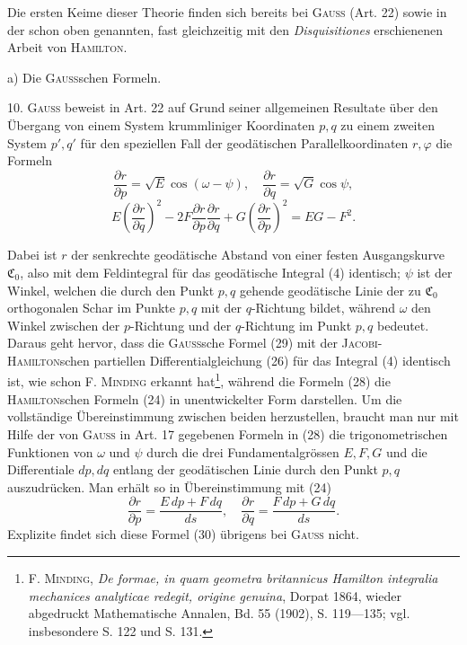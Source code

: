 Die ersten Keime dieser Theorie finden sich bereits bei \textsc{Gauss} (Art. 22)
sowie in der schon oben genannten, fast gleichzeitig mit den \textit{Disquisitiones}
erschienenen Arbeit von \textsc{Hamilton}.
\par\noindent\hspace*{\parindent}a) Die \textsc{Gauss}schen Formeln.
\par\noindent\hspace*{\parindent}10. \textsc{Gauss} beweist in Art. 22 auf Grund seiner allgemeinen Resultate
über den Übergang von einem System krummliniger Koordinaten $p,q$ zu einem
zweiten System $p',q'$ für den speziellen Fall der geodätischen Parallelkoordinaten
$r,\varphi$ die Formeln
\begin{equation*}\tag{28}
\frac{\partial r}{\partial p}=\sqrt E\cos(\omega-\psi),\quad\frac{\partial r}{\partial q}=\sqrt G\cos\psi,
\end{equation*}
\begin{equation*}\tag{29}
E\left(\frac{\partial r}{\partial q}\right)^2-2F\frac{\partial r}{\partial p}\frac{\partial r}{\partial q}+G\left(\frac{\partial r}{\partial p}\right)^2=EG-F^2.
\end{equation*}

Dabei ist $r$ der senkrechte geodätische Abstand von einer festen Ausgangskurve
$\mathfrak C_0$, also mit dem Feldintegral für das geodätische Integral (4) identisch;
$\psi$ ist der Winkel, welchen die durch den Punkt $p,q$ gehende geodätische
Linie der zu $\mathfrak C_0$ orthogonalen Schar im Punkte $p,q$ mit der $q$-Richtung bildet,
während $\omega$ den Winkel zwischen der $p$-Richtung und der $q$-Richtung im Punkt
$p,q$ bedeutet. Daraus geht hervor, dass die \textsc{Gauss}sche Formel (29) mit der
\textsc{Jacobi-Hamilton}schen partiellen Differentialgleichung (26) für das Integral (4)
identisch ist, wie schon F. \textsc{Minding} erkannt hat\begingroup\renewcommand{\thefootnote}{13a)}\footnote{F. \textsc{Minding}, \textit{De formae, in quam geometra britannicus Hamilton integralia mechanices analyticae
redegit, origine genuina}, Dorpat 1864, wieder abgedruckt Mathematische Annalen, Bd. 55 (1902),
S. 119—135; vgl. insbesondere S. 122 und S. 131.}\endgroup, während die Formeln (28)
die \textsc{Hamilton}schen Formeln (24) in unentwickelter Form darstellen. Um die
vollständige Übereinstimmung zwischen beiden herzustellen, braucht man nur
mit Hilfe der von \textsc{Gauss} in Art. 17 gegebenen Formeln in (28) die trigonometrischen
Funktionen von $\omega$ und $\psi$ durch die drei Fundamentalgrössen $E,F,G$
und die Differentiale $dp,dq$ entlang der geodätischen Linie durch den Punkt
$p,q$ auszudrücken. Man erhält so in Übereinstimmung mit (24)
\begin{equation*}\tag{30}
\frac{\partial r}{\partial p}=\frac{E\,dp+F\,dq}{ds},\quad\frac{\partial r}{\partial q}=\frac{F\,dp+G\,dq}{ds}.
\end{equation*}
\clearpage{}
\noindent\hspace*{\parindent}Explizite findet sich diese Formel (30) übrigens bei \textsc{Gauss} nicht.

